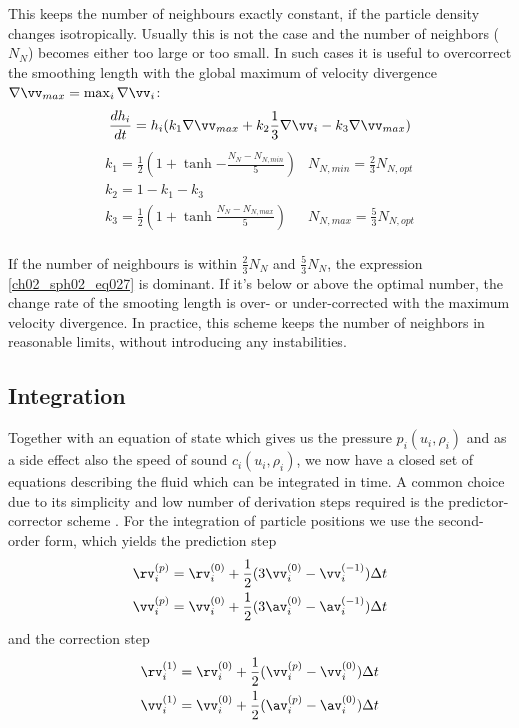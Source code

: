 This keeps the number of neighbours exactly constant, if the particle density changes isotropically. Usually this is not the case and the number of neighbors ($N_N$) becomes either too large or too small. In such cases it is useful to overcorrect the smoothing length with the global maximum of velocity divergence $\nabla \vv_{max} = \max_{i} \nabla \vv_i$:
\begin{equation}
\label{ch02_sph01_eq028}
\frac{d h_i}{d t} = h_i ( k_1 \nabla \vv_{max}+ k_2 \frac{1}{3} \nabla\vv_i - k_3 \nabla \vv_{max} )
\end{equation}
\begin{equation}
\label{ch02_sph01_eq029}
\begin{array}{ll}
k_1 = \frac{1}{2} (1 + \tanh{- \frac{N_N - N_{N,min}}{5}} ) & N_{N,min} = \frac{2}{3} N_{N,opt} \\
k_2 = 1 - k_1 - k_3 & \\
k_3 = \frac{1}{2} (1 + \tanh{\frac{N_N - N_{N,max}}{5}} ) & N_{N,max} = \frac{5}{3} N_{N,opt}\\
\end{array}
\end{equation}

If the number of neighbours is within $\frac{2}{3} N_N$ and $\frac{5}{3} N_N$, the expression \ref{ch02_sph02_eq027} is dominant. If it's below or above the optimal number, the change rate of the smooting length is over- or under-corrected with the maximum velocity divergence. In practice, this scheme keeps the number of neighbors in reasonable limits, without introducing any instabilities.

\subsection{Integration}
Together with an equation of state which gives us the pressure $p_i(u_i, \rho_i)$ and as a side effect also the speed of sound $c_i(u_i, \rho_i)$, we now have a closed set of equations describing the fluid which can be integrated in time. A common choice due to its simplicity and low number of derivation steps required is the predictor-corrector scheme \citep{Press2002nrc..book.....P}. For the integration of particle positions we use the second-order form, which yields the prediction step
\begin{eqnarray}
\label{ch02_sph02_eq019}
\rv_i^{(p)} = \rv_i^{(0)} + \frac{1}{2} ( 3 \vv_i^{(0)} - \vv_i^{(-1)} )\Delta t \\
\vv_i^{(p)} = \vv_i^{(0)} + \frac{1}{2} ( 3 \av_i^{(0)} - \av_i^{(-1)} )\Delta t
\end{eqnarray}
and the correction step
\begin{eqnarray}
\label{ch02_sph02_eq020}
\rv_i^{(1)} = \rv_i^{(0)} + \frac{1}{2} ( \vv_i^{(p)} - \vv_i^{(0)} )\Delta t \\
\vv_i^{(1)} = \vv_i^{(0)} + \frac{1}{2} ( \av_i^{(p)} - \av_i^{(0)} )\Delta t
\end{eqnarray}

